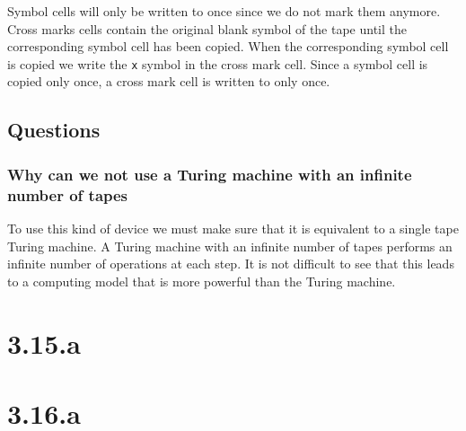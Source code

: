 \documentclass{article}
\begin{document}
Symbol cells will only be written to once since we do not mark them anymore.
Cross marks cells contain the original blank symbol of the tape until the
corresponding symbol cell has been copied. When the corresponding symbol cell
is copied we write the \texttt{x} symbol in the cross mark cell. Since a symbol
cell is copied only once, a cross mark cell is written to only once.


\subsection*{Questions}
\subsubsection{Why can we not use a Turing machine with an infinite number of
tapes}
To use this kind of device we must make sure that it is equivalent to a single
tape Turing machine.
A Turing machine with an infinite number of tapes performs an infinite number
of operations at each step. It is not difficult to see that this leads to a
computing model that is more powerful than the Turing machine.
\section*{3.15.a}
\section*{3.16.a}
\end{document}
